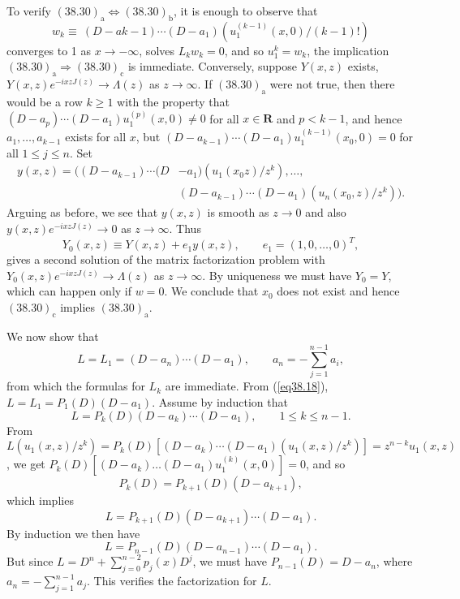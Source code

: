 \documentclass{surv-l}
\theoremstyle{plain}
\theoremstyle{definition}
\numberwithin{equation}{chapter}
\begin{document}
To verify $(38.30)_{\mathrm{a}}\Leftrightarrow(38.30)_{\mathrm{b}}$, it is enough to observe that
\begin{equation*}
w_{k}\equiv\ (D - ak-1)\cdots(D-a_{1})(u_{1}^{(k-1)}(x,0)/(k-1)!)
\end{equation*}
converges to 1 as $ x\rightarrow-\infty$, solves $L_{k}w_{k}=0$, and so $u_{1}^{k}=w_{k}$, the implication $(38.30)_{\mathrm{a}}\Rightarrow(38.30)_{\mathrm{c}}$ is immediate. Conversely, suppose $Y(x, z)$ exists, $Y(x, z)e^{-ixzJ(z)}\rightarrow\Lambda(z)$ as $ z\rightarrow\infty$. If $(38.30)_{\mathrm{a}}$ were not true, then there would be a row $k\geq 1$ with the property that $(D-a_{p})\cdots(D-a_{1})u_{1}^{(p)}(x, 0)\neq 0$ for all $x\in \mathbf{R}$ and $p<k-1$, and hence $ a_{1},\ldots,a_{k-1}$ exists for all $x$, but $(D-a_{k-1})\cdots (D-a_{1})u_{1}^{(k-1)}(x_{0},0)=0$ for all $1\leq j\leq n$. Set
\begin{align*}
y(x,z)=((D-a_{k-1})\cdots(D&-a_{1})(u_{1}(x_{0}z)/z^{k}),\ldots,\\
&(D-a_{k-1})\cdots(D-a_{1})(u_{n}(x_{0}, z)/z^{k})).
\end{align*}
Arguing as before, we see that $y(x, z)$ is smooth as $z\rightarrow 0$ and also $y(x, z)e^{-ixzJ(z)} \rightarrow 0$ as $ z\rightarrow\infty$. Thus
\begin{equation*}
Y_{0}(x, z)\equiv Y(x,z)+e_{1}y(x, z),\qquad e_{1}=(1,0, \ldots,0)^{T},
\end{equation*}
gives a second solution of the matrix factorization problem with $Y_{0}(x, z)e^{-ixzJ(z)} \rightarrow\Lambda(z)$ as $ z\rightarrow\infty$. By uniqueness we must have $Y_{0}=Y$, which can happen only if $w=0$. We conclude that $x_{0}$ does not exist and hence $(38.30)_{\mathrm{c}}$ implies $(38.30)_{\mathrm{a}}$.

We now show that
\begin{equation*}
L=L_{1}=(D-a_{n})\cdots (D-a_{1}),\qquad a_{n}=-\sum_{j=1}^{n-1}a_{i},
\end{equation*}
from which the formulas for $L_{k}$ are immediate. From (\ref{eq38.18}), $L=L_{1}= P_{1}(D)(D-a_{1})$. Assume by induction that
\begin{equation*}
L=P_{k}(D)(D-a_{k})\cdots(D-a_{1}),\qquad 1\leq k\leq n-1.
\end{equation*}
From $L(u_{1} (x, z)/z^{k})=P_{k}(D)[(D-a_{k})\cdots (D-a_{1})(u_{1}(x,z)/z^{k})]=z^{n-k}u_{1}(x, z)$, we get $P_{k}(D)[(D-a_{k})\ldots(D-a_{1})u_{1}^{(k)}(x, 0)]=0$, and so
\begin{equation*}
P_{k}(D)=P_{k+1}(D)(D-a_{k+1}),
\end{equation*}
which implies
\begin{equation*}
L=P_{k+1}(D)(D-a_{k+1})\cdots(D-a_{1}).
\end{equation*}
By induction we then have
\begin{equation*}
L=P_{n-1}(D)(D-a_{n-1})\cdots(D-a_{1}).
\end{equation*}
But since $L=D^{n}+\sum_{j=0}^{n-2}p_{j}(x)D^{j}$, we must have $P_{n-1}(D)=D-a_{n}$, where $a_{n}=- \sum_{j=1}^{n-1}a_{j}$. This verifies the factorization for $L$.
\end{document}
